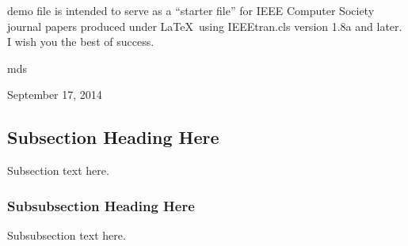 \documentclass[10pt,journal,compsoc]{IEEEtran}
\begin{document}




% 
% 
% 
% 
 demo file is intended to serve as a ``starter file''
for IEEE Computer Society journal papers produced under \LaTeX\ using
IEEEtran.cls version 1.8a and later.
I wish you the best of success.

\hfill mds
 
\hfill September 17, 2014

\subsection{Subsection Heading Here}
Subsection text here.


\subsubsection{Subsubsection Heading Here}
Subsubsection text here.
\end{document}
